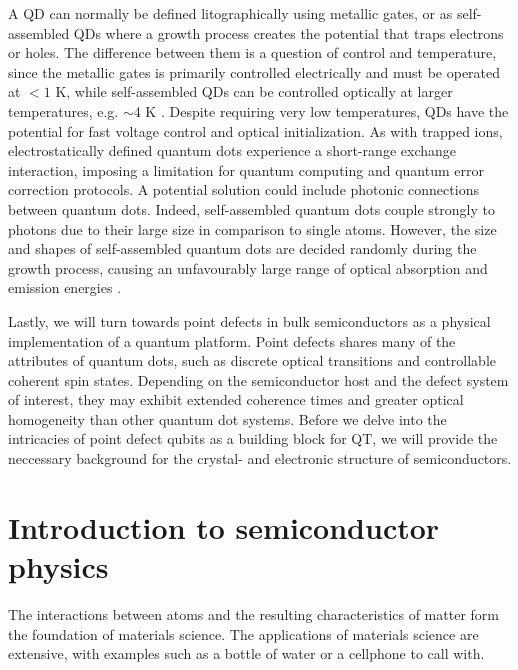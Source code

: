 A QD can normally be defined litographically using metallic gates, or as self-assembled QDs where a growth process creates the potential that traps electrons or holes. The difference between them is a question of control and temperature, since the metallic gates is primarily controlled electrically and must be operated at $<1$ K, while self-assembled QDs can be controlled optically at larger temperatures, e.g.  $\sim 4$ K \cite{Ladd2010}. %
Despite requiring very low temperatures, QDs have the potential for fast voltage control and optical initialization. As with trapped ions, electrostatically defined quantum dots experience a short-range exchange interaction, imposing a limitation for quantum computing and quantum error correction protocols. A potential solution could include photonic connections between quantum dots. Indeed, self-assembled quantum dots couple strongly to photons due to their large size in comparison to single atoms. However, the size and shapes of self-assembled quantum dots are decided randomly during the growth process, causing an unfavourably large range of optical absorption and emission energies \cite{Ladd2010}.




Lastly, we will turn towards point defects in bulk semiconductors as a physical implementation of a quantum platform. Point defects shares many of the attributes of quantum dots, such as discrete optical transitions and controllable coherent spin states. %
Depending on the semiconductor host and the defect system of interest, they may exhibit extended coherence times and greater optical homogeneity than other quantum dot systems. Before we delve into the intricacies of point defect qubits as a building block for QT, we will provide the neccessary background for the crystal- and electronic structure of semiconductors.   %

\section{Introduction to semiconductor physics}

The interactions between atoms and the resulting characteristics of matter form the foundation of materials science. The applications of materials science are extensive, with examples such as a bottle of water or a cellphone to call with.

